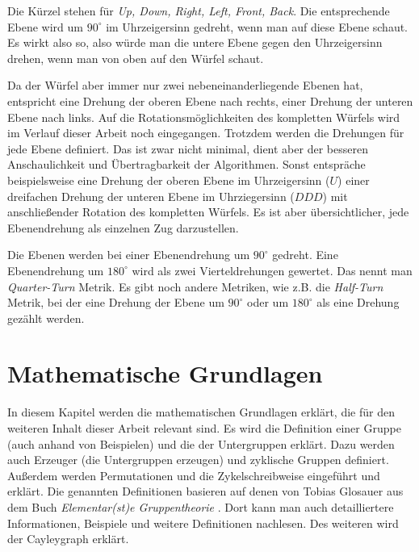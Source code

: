 \documentclass[12pt,a4paper, usenames, dvipsnames]{article}
\begin{document}
Die Kürzel stehen für \textit{Up, Down, Right, Left, Front, Back}. 
Die entsprechende Ebene wird um $90^\circ$ im Uhrzeigersinn gedreht, wenn man auf diese Ebene schaut. Es wirkt also so, also würde man die untere Ebene gegen den Uhrzeigersinn drehen, wenn man von oben auf den Würfel schaut.  


Da der Würfel aber immer nur zwei nebeneinanderliegende Ebenen hat, entspricht eine Drehung der oberen Ebene nach rechts, einer Drehung der unteren Ebene nach links. 
Auf die Rotationsmöglichkeiten des kompletten Würfels wird im Verlauf dieser Arbeit noch eingegangen. Trotzdem werden die Drehungen für jede Ebene definiert. Das ist zwar nicht minimal, dient aber der besseren Anschaulichkeit und Übertragbarkeit der Algorithmen.
Sonst entspräche beispielsweise eine Drehung der oberen Ebene im Uhrzeigersinn ($U$) einer dreifachen Drehung der unteren Ebene im Uhrziegersinn ($DDD$) mit anschließender Rotation des kompletten Würfels. Es ist aber übersichtlicher, jede Ebenendrehung als einzelnen Zug darzustellen.

Die Ebenen werden bei einer Ebenendrehung um $90^\circ$ gedreht. Eine Ebenendrehung um $180^\circ$ wird als zwei Vierteldrehungen gewertet. Das nennt man \textit{Quarter-Turn} Metrik. Es gibt noch andere Metriken, wie z.B. die \textit{Half-Turn} Metrik, bei der eine Drehung der Ebene um $90^\circ$ oder um $180^\circ$ als eine Drehung gezählt werden. \cite{TR}


%
%
%
%
%
%
%
%
%
%
%
%
%
%
%
%
%


\newpage
\section{Mathematische Grundlagen}

In diesem Kapitel werden die mathematischen Grundlagen erklärt, die für den weiteren Inhalt dieser Arbeit relevant sind. Es wird die Definition einer Gruppe (auch anhand von Beispielen) und die der Untergruppen erklärt. Dazu werden auch Erzeuger (die Untergruppen erzeugen) und zyklische Gruppen definiert. Außerdem werden Permutationen und die Zykelschreibweise eingeführt und erklärt. 
Die genannten Definitionen basieren auf denen von Tobias Glosauer aus dem Buch \textit{Elementar(st)e Gruppentheorie} \cite{Buch}. Dort kann man auch detailliertere Informationen, Beispiele und weitere Definitionen nachlesen.
Des weiteren wird der Cayleygraph erklärt. 
%
%
%
%
%
%
\end{document}
